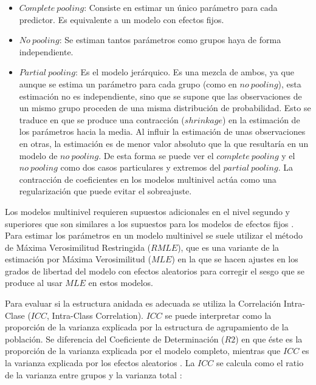 \documentclass[
  12pt,
  a4paper,
  extrafontsizes,
  onecolumn,
  openright,
  table]{memoir}
\providecommand{\tightlist}{%
  \setlength{\itemsep}{0pt}\setlength{\parskip}{0pt}}\usepackage{longtable,booktabs,array}
\newlength{\rf}
\begin{document}
\begin{itemize}
\tightlist
\item
  \(Complete\ pooling\): Consiste en estimar un único parámetro para
  cada predictor. Es equivalente a un modelo con efectos fijos.
\item
  \(No\ pooling\): Se estiman tantos parámetros como grupos haya de
  forma independiente.
\item
  \(Partial\ pooling\): Es el modelo jerárquico. Es una mezcla de ambos,
  ya que aunque se estima un parámetro para cada grupo (como en
  \(no\ pooling\)), esta estimación no es independiente, sino que se
  supone que las observaciones de un mismo grupo proceden de una misma
  distribución de probabilidad. Esto se traduce en que se produce una
  contracción (\(shrinkage\)) en la estimación de los parámetros hacia
  la media. Al influir la estimación de unas observaciones en otras, la
  estimación es de menor valor absoluto que la que resultaría en un
  modelo de \(no\ pooling\). De esta forma se puede ver el
  \(complete\ pooling\) y el \(no\ pooling\) como dos casos particulares
  y extremos del \(partial\ pooling\). La contracción de coeficientes en
  los modelos multinivel actúa como una regularización que puede evitar
  el sobreajuste.
\end{itemize}

Los modelos multinivel requieren supuestos adicionales en el nivel
segundo y superiores que son similares a los supuestos para los modelos
de efectos fijos \autocite[ver][p.~43]{chen2021}. Para estimar los
parámetros en un modelo multinivel se suele utilizar el método de Máxima
Verosimilitud Restringida (\(RMLE\)), que es una variante de la
estimación por Máxima Verosimilitud (\(MLE\)) en la que se hacen ajustes
en los grados de libertad del modelo con efectos aleatorios para
corregir el sesgo que se produce al usar \(MLE\) en estos modelos.

Para evaluar si la estructura anidada es adecuada se utiliza la
Correlación Intra-Clase (\(ICC\), Intra-Class Correlation). \(ICC\) se
puede interpretar como la proporción de la varianza explicada por la
estructura de agrupamiento de la población. Se diferencia del
Coeficiente de Determinación (\(R2\)) en que éste es la proporción de la
varianza explicada por el modelo completo, mientras que \(ICC\) es la
varianza explicada por los efectos aleatorios
\autocite[ver][]{performance}. La \(ICC\) se calcula como el ratio de la
varianza entre grupos y la varianza total
\autocite[ver][pp.~29-33]{chen2021}:
\end{document}
